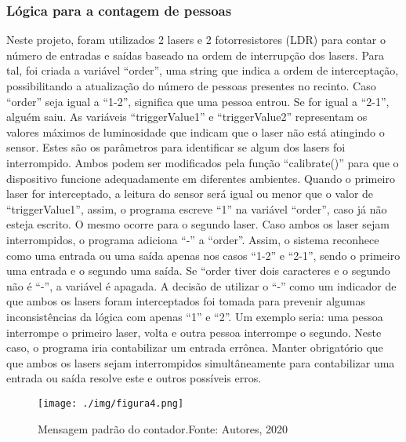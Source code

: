 \documentclass[10pt,twocolumn,letterpaper]{article}
\begin{document}
\subsubsection{Lógica para a contagem de pessoas}

Neste projeto, foram utilizados 2 lasers e 2 fotorresistores (LDR) para contar o número de entradas e saídas baseado na ordem de interrupção dos lasers. Para tal, foi criada a variável “order”, uma string que indica a ordem de interceptação, possibilitando a atualização do número de pessoas presentes no recinto. Caso “order” seja igual a “1-2”, significa que uma pessoa entrou. Se for igual a “2-1”, alguém saiu. 
As variáveis “triggerValue1” e “triggerValue2” representam os valores máximos de luminosidade que indicam que o laser não está atingindo o sensor. Estes são os parâmetros para identificar se algum dos lasers foi interrompido.  Ambos podem ser modificados pela função “calibrate()” para que o dispositivo funcione adequadamente em diferentes ambientes. 
Quando o primeiro laser for interceptado, a leitura do sensor será igual ou menor que o valor de “triggerValue1”, assim, o programa escreve “1” na variável “order”, caso já não esteja escrito. O mesmo ocorre para o segundo laser. Caso ambos os laser sejam interrompidos, o programa adiciona “-” a “order”. Assim, o sistema reconhece como uma entrada ou uma saída apenas nos casos “1-2” e “2-1”, sendo o primeiro uma entrada e o segundo uma saída. Se “order tiver dois caracteres e o segundo não é “-”, a variável é apagada. A decisão de utilizar o “-” como um indicador de que ambos os lasers foram interceptados foi tomada para prevenir algumas inconsistências da lógica com apenas “1” e “2”. Um exemplo seria: uma pessoa interrompe o primeiro laser, volta e outra pessoa interrompe o segundo. Neste caso, o programa iria contabilizar um entrada errônea. Manter obrigatório que que ambos os lasers sejam interrompidos simultâneamente para contabilizar uma entrada ou saída resolve este e outros possíveis erros. 

{
\begin{figure}[!h]
\begin{center}
   \texttt{[image: ./img/figura4.png]}
\end{center}
   \caption{Mensagem padrão do contador.\newline \centering Fonte: Autores, 2020}
\label{fig:figura4}
\end{figure}
}
\end{document}
